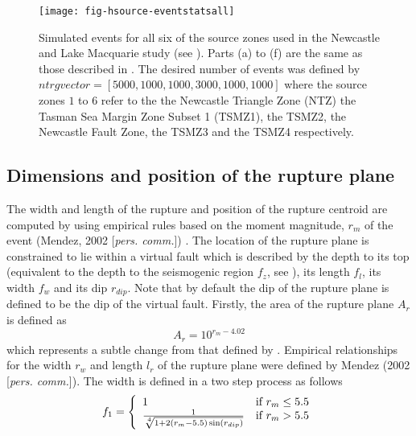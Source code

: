 \begin{figure}
\begin{center}
\texttt{[image: fig-hsource-eventstatsall]}
\end{center}
\caption{Simulated events for all six of the source zones used in
the Newcastle and Lake Macquarie study (see \citealt{dr_Dhu02b}).
Parts (a) to (f) are the same as those described in
. The desired number of events
was defined by $ntrgvector = [5000,1000,1000,3000,1000,1000]$
where the source zones $1$ to $6$ refer to the the Newcastle
Triangle Zone (NTZ) the Tasman Sea Margin Zone Subset 1 (TSMZ1),
the TSMZ2, the Newcastle Fault Zone, the TSMZ3 and the TSMZ4
respectively.} \label{fig:source-catalogue-results4}
\end{figure}


\subsection{Dimensions and position of the rupture plane}
\label{sec:dim-rupture}


The width and length of the rupture and position of the rupture
centroid are computed by  using empirical
rules based on the moment magnitude, $r_m$ of the event (Mendez,
2002 [\textit{pers. comm.}]) . The location of the rupture plane
is constrained to lie within a virtual fault
which is described by the depth to its top (equivalent to the
depth to the seismogenic region $f_z$, see
), its length $f_l$, its width
$f_w$ and its dip $r_{dip}$. Note that by default the dip of the
 rupture plane is defined to be the dip of the virtual fault.
Firstly, the area of the rupture plane $A_r$ is defined as
\begin{equation}
A_r = 10^{r_m - 4.02}
\end{equation}
which represents a subtle change from that defined by
\citet*{dr_Wells94a}. Empirical relationships for the width $r_w$
and length $l_r$ of the rupture plane were defined by Mendez (2002
[\textit{pers. comm.}]). The width is defined in a two step
process as follows
\begin{equation}
 f_1 = \left \{ \begin{array}{ll}
 1 & \textrm{if $r_m \leq 5.5$} \\
\frac{1}{\sqrt[\leftroot{-2}\uproot{2}4]{1+2(r_m-5.5)\sin(r_{dip})}} & \textrm{if $r_m>5.5$} \\
\end{array} \right.
\end{equation}

